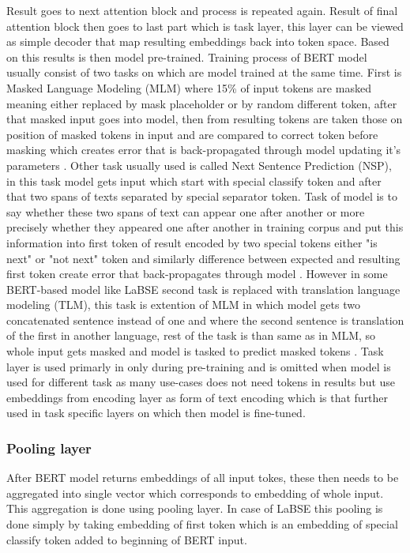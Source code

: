 Result goes to next attention block and process is repeated again. Result of final attention block then goes to last part which is task layer, this layer can be viewed as simple decoder that map resulting embeddings back into token space. Based on this results is then model pre-trained. Training process of BERT model usually consist of two tasks on which are model trained at the same time. First is Masked Language Modeling (MLM) where 15\% of input tokens are masked meaning either replaced by mask placeholder or by random different token, after that masked input goes into model, then from resulting tokens are taken those on position of masked tokens in input and are compared to correct token before masking which creates error that is back-propagated through model updating it's parameters \cite{bert_pretr_1}. Other task usually used is called Next Sentence Prediction (NSP), in this task model gets input which start with special classify token and after that two spans of texts separated by special separator token. Task of model is to say whether these two spans of text can appear one after another or more precisely whether they appeared one after another in training corpus and put this information into first token of result encoded by two special tokens either "is next" or "not next" token and similarly difference between expected and resulting first token create error that back-propagates through model \cite{bert_pretr_2}. However in some BERT-based model like LaBSE second task is replaced with translation language modeling (TLM), this task is extention of MLM in which model gets two concatenated sentence instead of one and where the second sentence is translation of the first in another language, rest of the task is than same as in MLM, so whole input gets masked and model is tasked to predict masked tokens \cite{bert_pretr_3}. Task layer is used primarly in only during pre-training and is omitted when model is used for different task as many use-cases does not need tokens in results but use embeddings from encoding layer as form of text encoding which is that further used in task specific layers on which then model is fine-tuned.

\subsubsection{Pooling layer}

After BERT model returns embeddings of all input tokes, these then needs to be aggregated into single vector which corresponds to embedding of whole input. This aggregation is done using pooling layer. In case of LaBSE this pooling is done simply by taking embedding of first token which is an embedding of special classify token added to beginning of BERT input.    

